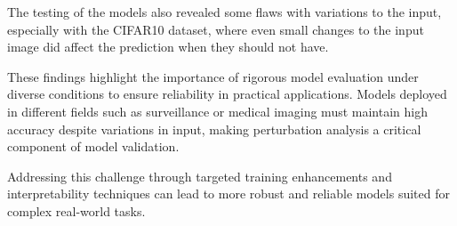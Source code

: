 \documentclass[journal, a4paper]{IEEEtran}
\begin{document}
The testing of the models also revealed some flaws with variations to the input, especially with the CIFAR10 dataset, where even small changes to the input image did affect the prediction when they should not have.

These findings highlight the importance of rigorous model evaluation under diverse conditions to ensure reliability in practical applications.
Models deployed in different fields such as surveillance or medical imaging must maintain high accuracy despite variations in input, making perturbation analysis a critical component of model validation.

Addressing this challenge through targeted training enhancements and interpretability techniques can lead to more robust and reliable models suited for complex real-world tasks.



\end{document}
